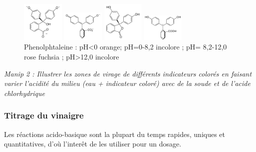 \documentclass{article}%
\begin{document}
\begin{figure}
	\begin{minipage}[t]{0,24\textwidth}
	\includegraphics[width=2cm]{images/indicateurs/Phenolphthalein-high-pH-2D-skeletal.png}
\end{minipage}
	\begin{minipage}[t]{0,24\textwidth}
	\includegraphics[width=2cm]{images/indicateurs/Phenolphthalein-mid-pH-2D-skeletal.png}
\end{minipage}
	\begin{minipage}[t]{0,24\textwidth}
	\includegraphics[width=2cm]{images/indicateurs/Phenolphthalein-low-pH-2D-skeletal.png}
\end{minipage}
	\begin{minipage}[t]{0,24\textwidth}
	\includegraphics[width=2cm]{images/indicateurs/Phenolphthalein-very-low-pH-2D-skeletal.png}
\end{minipage}
\caption{Phenolphtaleine : pH<0 orange; pH=0-8,2 incolore ; pH= 8,2-12,0 rose fuchsia ; pH>12,0 incolore}
\end{figure}
\textit{Manip 2 : Illustrer les zones de virage de différents indicateurs colorés en faisant varier l’acidité du milieu (eau + indicateur coloré) avec de la soude et de l’acide chlorhydrique}

\subsubsection{Titrage du vinaigre}

Les réactions acido-basique sont la plupart du temps rapides, uniques et quantitatives, d'où l'interêt de les utiliser pour un dosage.
\end{document}
